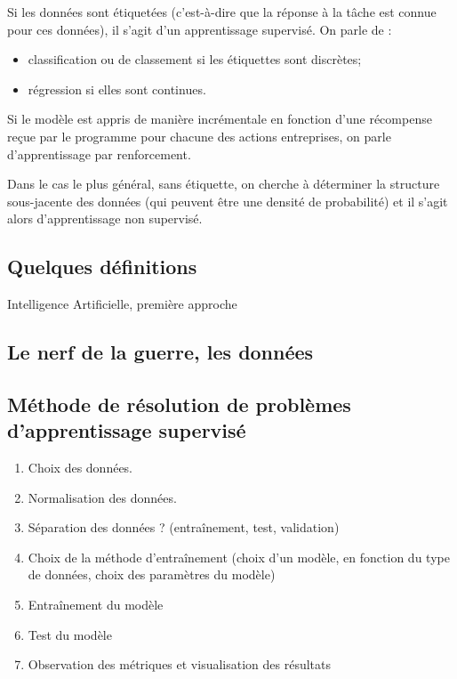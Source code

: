 \begin{defi} 
Si les données sont étiquetées (c'est-à-dire que la réponse à la tâche est connue pour ces données), il s'agit d'un apprentissage supervisé. On parle de :
\begin{itemize}
\item classification ou de classement si les étiquettes sont discrètes;
\item régression si elles sont continues.
\end{itemize}

Si le modèle est appris de manière incrémentale en fonction d'une récompense reçue par le programme pour chacune des actions entreprises, on parle d'apprentissage par renforcement. 

Dans le cas le plus général, sans étiquette, on cherche à déterminer la structure sous-jacente des données (qui peuvent être une densité de probabilité) et il s'agit alors d'apprentissage non supervisé.



\end{defi}



\subsection{Quelques définitions}
\begin{defi}{Intelligence Artificielle, première approche}

\end{defi}

\subsection{Le nerf de la guerre, les données}



\subsection{Méthode de résolution de problèmes d'apprentissage supervisé}

\begin{enumerate}
\item Choix des données.
\item Normalisation des données. 
\item Séparation des données ? (entraînement, test, validation)
\item Choix de la méthode d’entraînement (choix d'un modèle, en fonction du type de données, choix des paramètres du modèle)
\item Entraînement du modèle
\item Test du modèle
\item Observation des métriques et visualisation des résultats
\end{enumerate}

